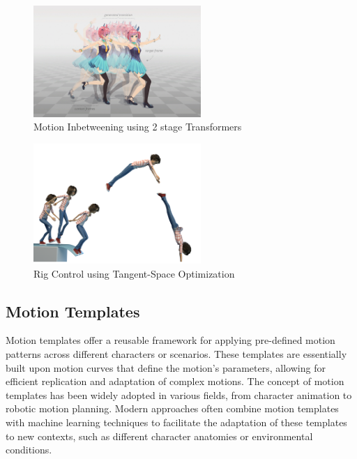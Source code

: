 \documentclass[../../main.tex]{subfiles}
\begin{document}
\begin{figure}
    \centering \includegraphics[width = 2.5in]{chapters/intermediate_blocks/images/inbetweening_transformers.jpg}
    \caption{Motion Inbetweening using 2 stage Transformers~\cite{10.1145/3306346.3322938}}
    \label{fig:inbetweening_transformers}
\end{figure}

\begin{figure}
    \centering \includegraphics[width = 2.5in]{chapters/intermediate_blocks/images/inbetweening_disney.png}
    \caption{Rig Control using Tangent-Space Optimization}
    \label{fig:inbetweening_disney}
\end{figure}

\subsection{Motion Templates}
\label{ch:intermediate_blocks_pose_correction:related_work:motion_templates}

Motion templates offer a reusable framework for applying pre-defined motion patterns across different characters or scenarios. These templates are essentially built upon motion curves that define the motion's parameters, allowing for efficient replication and adaptation of complex motions. The concept of motion templates has been widely adopted in various fields, from character animation to robotic motion planning. Modern approaches often combine motion templates with machine learning techniques to facilitate the adaptation of these templates to new contexts, such as different character anatomies or environmental conditions.
\end{document}
